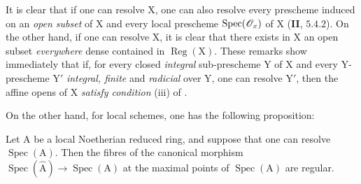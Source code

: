 \begin{env}[7.9.2]
\label{IV.7.9.2}
It is clear that if one can resolve $\mathrm{X}$, one can also resolve every prescheme induced on an \emph{open subset} of $\mathrm{X}$ and every local prescheme $\operatorname{Spec}(\mathscr{O}_x)$ of $\mathrm{X}$ (\textbf{II}, $5.4.2$). On the other hand, if one can resolve $\mathrm{X}$, it is clear that there exists in $\mathrm{X}$ an open subset \emph{everywhere} dense contained in $\operatorname{Reg}(\mathrm{X})$. These remarks show immediately that if, for every closed \emph{integral} sub-prescheme $\mathrm{Y}$ of $\mathrm{X}$ and every $\mathrm{Y}$-prescheme $\mathrm{Y}'$ \emph{integral, finite} and \emph{radicial} over $\mathrm{Y}$, one can resolve $\mathrm{Y}'$, then the affine opens of $\mathrm{X}$ \emph{satisfy condition} (iii) of .

On the other hand, for local schemes, one has the following proposition:
\end{env}

\begin{proposition}[7.9.3]
\label{IV.7.9.3}
Let $\mathrm{A}$ be a local Noetherian reduced ring, and suppose that one can resolve $\operatorname{Spec}(\mathrm{A})$. Then the fibres of the canonical morphism $\operatorname{Spec}(\widehat{\mathrm{A}})\to\operatorname{Spec}(\mathrm{A})$ at the maximal points of $\operatorname{Spec}(\mathrm{A})$ are regular.
\end{proposition}

